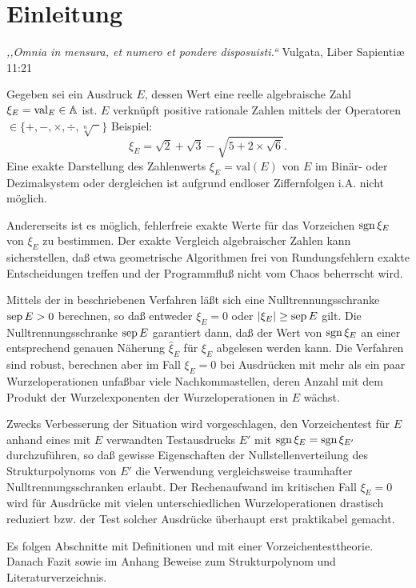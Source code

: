 %
%
\pagebreak
\section{Einleitung}\label{se:Einleitung}


\begin{flushright}
\begin{minipage}{6.85cm}
{\em ,,Omnia in mensura, et numero et pondere disposuisti.``} \hfill
\scriptsize{Vulgata, Liber Sapientiæ 11:21}
\end{minipage}
\end{flushright}


\noindent
Gegeben sei ein Ausdruck $E$,
dessen Wert eine reelle algebraische Zahl $\xi_E=\mathop{\rm val}\nolimits_E\in\mathbb{A}$ ist.
$E$ verknüpft positive rationale Zahlen
mittels der Operatoren $\in\{+, -, \times, \div, \sqrt[n]{\phantom{x}}\}$
Beispiel:
\begin{equation}\label{eq:ausdruck}
  \xi_E = \sqrt{2} + \sqrt{3} - \sqrt{5 + 2\times\sqrt{6}}.
\end{equation}
Eine exakte Darstellung des Zahlenwerts $\xi_E = \textrm{val}(E)$ von $E$ 
im Binär- oder Dezimalsystem oder dergleichen ist 
aufgrund endloser Ziffernfolgen i.A. nicht möglich.

Andererseits ist es möglich, fehlerfreie exakte Werte 
für das Vorzeichen $\operatorname{sgn}{\xi_E}$ von $\xi_E$ zu bestimmen. 
Der exakte Vergleich algebraischer Zahlen kann sicherstellen,
daß etwa geometrische Algorithmen
frei von Rundungsfehlern exakte Entscheidungen treffen
und der Programmfluß nicht vom Chaos beherrscht wird.

Mittels der
in \cite{Mignotte, BFMS, BFMSS, PIYAP} beschriebenen Verfahren
läßt sich eine Nulltrennungsschranke $\mathop{\rm sep}\nolimits E>0$ berechnen, 
so daß entweder $\xi_E=0$ oder $|\xi_E|\ge\mathop{\rm sep}\nolimits E$ gilt.  %
Die Nulltrennungsschranke $\mathop{\rm sep}\nolimits E$ garantiert dann, 
daß der Wert von $\operatorname{sgn}{\xi_E}$
an einer entsprechend genauen Näherung $\hat{\xi}_E$ für $\xi_E$
abgelesen werden kann.
Die Verfahren sind robust, 
berechnen aber im Fall $\xi_E=0$ 
bei Ausdrücken mit mehr als ein paar Wurzeloperationen
unfaßbar viele Nachkommastellen,
deren Anzahl mit dem Produkt der Wurzelexponenten
der Wurzeloperationen in $E$ wächst.

Zwecks Verbesserung der Situation wird vorgeschlagen,
den Vorzeichentest für $E$ 
anhand eines mit $E$ verwandten Testausdrucks $E'$ 
mit $\operatorname{sgn}\xi_E=\operatorname{sgn}\xi_{E'}$ durchzuführen,
so daß gewisse Eigenschaften der Nullstellenverteilung 
des Strukturpolynoms von $E'$ die Verwendung
vergleichsweise traumhafter Nulltrennungsschranken erlaubt.
Der Rechenaufwand im kritischen Fall $\xi_E=0$
wird für Ausdrücke mit vielen unterschiedlichen Wurzeloperationen 
drastisch reduziert bzw. der Test solcher Ausdrücke
überhaupt erst praktikabel gemacht.

Es folgen Abschnitte mit Definitionen
und mit einer Vorzeichentesttheorie.
Danach Fazit 
sowie im Anhang Beweise zum Strukturpolynom
und Literaturverzeichnis.

%
%
